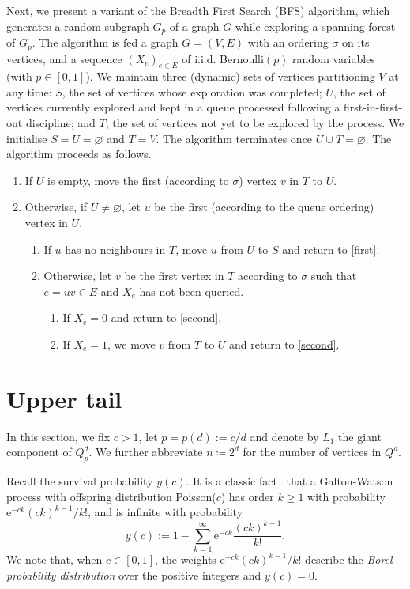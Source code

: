 \documentclass[reqno,final,a4paper]{amsart}
\theoremstyle{definition}
\def\e{\mathrm{e}}
\newcommand{\1}{\mathbbm{1}}
\begin{document}
Next, we present a variant of the Breadth First Search (BFS) algorithm, which generates a random subgraph $G_p$ of a graph $G$ while exploring a spanning forest of $G_p$. The algorithm is fed a graph $G=(V,E)$ with an ordering $\sigma$ on its vertices, and a sequence $(X_e)_{e\in E}$ of i.i.d. Bernoulli$(p)$ random variables (with $p\in [0,1]$). 
We maintain three (dynamic) sets of vertices partitioning $V$ at any time: $S$, the set of vertices whose exploration was completed; 
$U$, the set of vertices currently explored and kept in a queue processed following a first-in-first-out discipline; 
and $T$, the set of vertices not yet to be explored by the process. We initialise $S=U=\varnothing$ and $T=V$. The algorithm terminates once $U\cup T=\varnothing$. The algorithm proceeds as follows.
\begin{enumerate}
    \item If $U$ is empty, move the first (according to $\sigma$) vertex $v$ in $T$ to $U$.\label{first}
    \item Otherwise, if $U\neq \varnothing$, let $u$ be the first (according to the queue ordering) vertex in $U$.
    \begin{enumerate}
        \item If $u$ has no neighbours in $T$, move $u$ from $U$ to $S$ and return to \eqref{first}.\label{second}
        \item Otherwise, let $v$ be the first vertex in $T$ according to $\sigma$ such that $e=uv\in E$ and $X_e$ has not been queried.
        \begin{enumerate}
            \item If $X_e=0$ and return to \eqref{second}.
            \item If $X_e=1$, we move $v$ from $T$ to $U$ and return to \eqref{second}.
        \end{enumerate}
    \end{enumerate}
\end{enumerate}

\section{Upper tail}\label{s: upper tail}
In this section, we fix $c>1$, let $p=p(d):=c/d$ and denote by $L_1$ the giant component of $Q^d_p$. 
We further abbreviate $n\coloneqq 2^d$ for the number of vertices in $Q^d$. 

Recall the survival probability $y(c)$. It is a classic fact~\cite{Dwa69,Ott49,Pit97} that a Galton-Watson process with offspring distribution Poisson($c$) has order $k\ge 1$ with probability $\e^{-ck}(ck)^{k-1}/k!$, and is infinite with probability
\begin{equation}\label{eq: ER}
    y(c) := 1-\sum_{k=1}^{\infty}\e^{-ck}\frac{(ck)^{k-1}}{k!}.
\end{equation}
We note that, when $c\in [0,1]$, the weights $\e^{-ck}(ck)^{k-1}/k!$ describe the \emph{Borel probability distribution} over the positive integers and $y(c)=0$.
\end{document}
